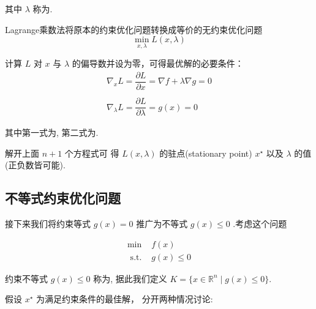 其中 $ \lambda $ 称为. 

\begin{theorem}
    Lagrange乘数法将原本的约束优化问题转换成等价的无约束优化问题
\begin{equation}
\min _{{x}, \lambda} L({x}, \lambda)
\end{equation}
\end{theorem}

\begin{theorem}[拉格朗日乘子法最优解必要条件]
    计算 $ L $ 对 $ {x} $ 与 $ \lambda $ 的偏导数并设为零，可得最优解的必要条件：
\begin{equation}
\begin{array}{l}
\nabla_{{x}} L=\dfrac{\partial L}{\partial {x}}=\nabla f+\lambda \nabla g={0} \\
\\
\nabla_{\lambda} L=\dfrac{\partial L}{\partial \lambda}=g({x})=0
\end{array}
\end{equation}

其中第一式为, 第二式为.
\end{theorem}


解开上面 $ n+1 $ 个方程式可 得 $ L({x}, \lambda) $ 的驻点(stationary point) $ {x}^{\star} $ 以及 $ \lambda $ 的值(正负数皆可能).

\subsection{不等式约束优化问题}

接下来我们将约束等式 $ g({x})=0 $ 推广为不等式 $ g({x}) \leq 0 $ .考虑这个问题

\begin{problem}[不等式约束优化问题]

\begin{equation}
\begin{array}{ll}
\min & f({x}) \\
\text { s.t. } & g({x}) \leq 0
\end{array}
\end{equation}

约束不等式 $ g({x}) \leq 0 $ 称为, 据此我们定义 $ K=\{ {x} \in \mathbb{R}^{n} \mid g({x}) \leq 0 \}$.
\end{problem}

假设 $ {x}^{\star} $ 为满足约束条件的最佳解， 分开两种情况讨论:

